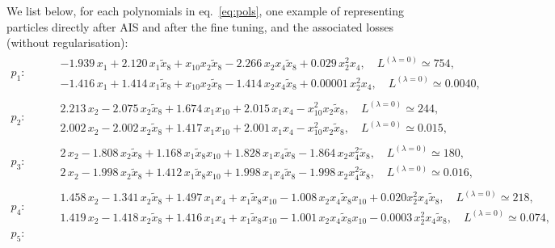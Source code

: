 \documentclass[11pt]{article}
\begin{document}
\begin{enumerate}
	  We list below, for each polynomials in eq.~\eqref{eq:pols}, one example of representing particles directly after AIS and after the fine tuning, and the associated losses (without regularisation):
	  \begin{align}
	  	p_{1}:&\quad
	  	\begin{aligned}
	  		&-1.939\,x_{1} + 2.120\,x_{1}\tilde{x}_{8} + x_{10}x_{2}\tilde{x}_{8} - 2.266\, x_{2}x_{4}\tilde{x}_{8} + 0.029\,x_{2}^{2}x_{4},\quad L^{(\lambda = 0)} \simeq 754, \\
			&-1.416\,x_{1} + 1.414\, x_{1}\tilde{x}_{8} + x_{10}x_{2}\tilde{x}_{8} - 1.414\,x_{2}x_{4}\tilde{x}_{8} + 0.00001\,x_{2}^{2}x_{4},\quad L^{(\lambda = 0)} \simeq 0.0040,
	  	\end{aligned} \\[7pt]
	  	p_{2}:&\quad
	  	\begin{aligned}
	  		&2.213\,x_{2} - 2.075\,x_{2}\tilde{x}_{8} + 1.674\,x_{1}x_{10} + 2.015\,x_{1}x_{4} - x_{10}^{2}x_{2}\tilde{x}_{8},\quad L^{(\lambda = 0)} \simeq 244, \\
			&2.002\,x_{2} - 2.002\,x_{2}\tilde{x}_{8} + 1.417\,x_{1}x_{10} + 2.001\,x_{1}x_{4} - x_{10}^{2}x_{2}\tilde{x}_{8},\quad L^{(\lambda = 0)} \simeq 0.015,
	  	\end{aligned} \\[7pt]
	  	p_{3}:&\quad
	  	\begin{aligned}
	  		&2\,x_{2} - 1.808\,x_{2}\tilde{x}_{8} + 1.168\,x_{1}\tilde{x}_{8}x_{10} + 1.828\,x_{1}x_{4}\tilde{x}_{8} - 1.864\,x_{2}x_{4}^{2}\tilde{x}_{8},\quad L^{(\lambda = 0)} \simeq 180, \\
			&2\,x_{2} - 1.998\,x_{2}\tilde{x}_{8} + 1.412\,x_{1}\tilde{x}_{8}x_{10} + 1.998\,x_{1}x_{4}\tilde{x}_{8} - 1.998\,x_{2}x_{4}^{2}\tilde{x}_{8},\quad L^{(\lambda = 0)} \simeq 0.016,
	  	\end{aligned} \\[7pt]
	  	p_{4}:&\quad
	  	\begin{aligned}
	  		&1.458\,x_{2} - 1.341\,x_{2}\tilde{x}_{8} + 1.497\,x_{1}x_{4} + x_{1}\tilde{x}_{8}x_{10} - 1.008\,x_{2}x_{4}\tilde{x}_{8}x_{10} + 0.020 x_{2}^{2}x_{4}\tilde{x}_{8},\quad L^{(\lambda = 0)} \simeq 218, \\
			&1.419\,x_{2} - 1.418\,x_{2}\tilde{x}_{8} + 1.416\,x_{1}x_{4} + x_{1}\tilde{x}_{8}x_{10} - 1.001\,x_{2}x_{4}\tilde{x}_{8}x_{10} - 0.0003\,x_{2}^{2}x_{4}\tilde{x}_{8},\quad L^{(\lambda = 0)} \simeq 0.074,
	  	\end{aligned} \\[7pt]
	  	p_{5}:&\quad

\end{align}
\end{enumerate}
\end{document}
